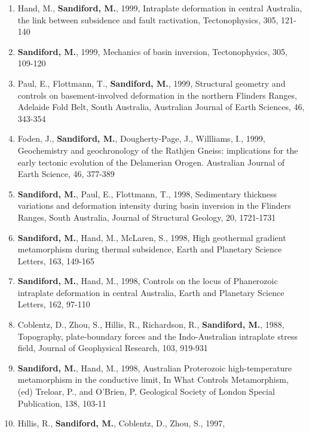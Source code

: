 \documentclass[
]{article}
\begin{document}
\begin{enumerate}
\item
  Hand, M., \textbf{Sandiford, M.}, 1999, Intraplate deformation in
  central Australia, the link between subsidence and fault ractivation,
  Tectonophysics, 305, 121-140 
\item
  \textbf{Sandiford, M.}, 1999, Mechanics of basin inversion,
  Tectonophysics, 305, 109-120 
\item
  Paul, E., Flottmann, T., \textbf{Sandiford, M.}, 1999, Structural
  geometry and controls on basement-involved deformation in the northern
  Flinders Ranges, Adelaide Fold Belt, South Australia, Australian
  Journal of Earth Sciences, 46, 343-354 
\item
  Foden, J., \textbf{Sandiford, M.}, Dougherty-Page, J., Willliams, I.,
  1999, Geochemistry and geochronology of the Rathjen Gneiss:
  implications for the early tectonic evolution of the Delamerian
  Orogen. Australian Journal of Earth Science, 46, 377-389
\item
  \textbf{Sandiford, M.}, Paul, E., Flottmann, T., 1998, Sedimentary
  thickness variations and deformation intensity during basin inversion
  in the Flinders Ranges, South Australia, Journal of Structural
  Geology, 20, 1721-1731 
\item
  \textbf{Sandiford, M.}, Hand, M., McLaren, S., 1998, High geothermal
  gradient metamorphism during thermal subsidence, Earth and Planetary
  Science Letters, 163, 149-165 
\item
  \textbf{Sandiford, M.}, Hand, M., 1998, Controls on the locus of
  Phanerozoic intraplate deformation in central Australia, Earth and
  Planetary Science Letters, 162, 97-110 
\item
  Coblentz, D., Zhou, S., Hillis, R., Richardson, R., \textbf{Sandiford,
  M.}, 1988, Topography, plate-boundary forces and the Indo-Australian
  intraplate stress field, Journal of Geophysical Research, 103, 919-931
\item
  \textbf{Sandiford, M.}, Hand, M., 1998, Australian Proterozoic
  high-temperature metamorphism in the conductive limit, In What
  Controls Metamorphism, (ed) Treloar, P., and O'Brien, P, Geological
  Society of London Special Publication, 138, 103-11
\item
  Hillis, R., \textbf{Sandiford, M.}, Coblentz, D., Zhou, S., 1997,

\end{enumerate}
\end{document}
